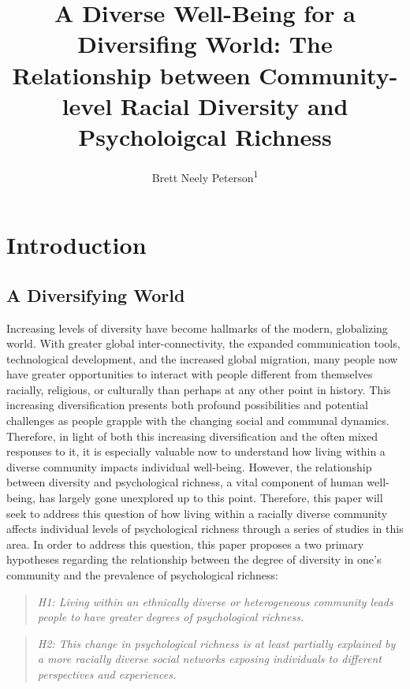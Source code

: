 \documentclass[
  man,floatsintext]{apa7}
\title{A Diverse Well-Being for a Diversifing World: The Relationship between Community-level Racial Diversity and Psycholoigcal Richness}
\author{Brett Neely Peterson\textsuperscript{1}}
\date{}
\affiliation{\vspace{0.5cm}\textsuperscript{1} The University of Chicago}
\begin{document}
\maketitle

\hypertarget{introduction}{%
\section{Introduction}\label{introduction}}

\hypertarget{a-diversifying-world}{%
\subsection{A Diversifying World}\label{a-diversifying-world}}

Increasing levels of diversity have become hallmarks of the modern, globalizing world. With greater global inter-connectivity, the expanded communication tools, technological development, and the increased global migration, many people now have greater opportunities to interact with people different from themselves racially, religious, or culturally than perhaps at any other point in history. This increasing diversification presents both profound possibilities and potential challenges as people grapple with the changing social and communal dynamics. Therefore, in light of both this increasing diversification and the often mixed responses to it, it is especially valuable now to understand how living within a diverse community impacts individual well-being. However, the relationship between diversity and psychological richness, a vital component of human well-being, has largely gone unexplored up to this point. Therefore, this paper will seek to address this question of how living within a racially diverse community affects individual levels of psychological richness through a series of studies in this area. In order to address this question, this paper proposes a two primary hypotheses regarding the relationship between the degree of diversity in one's community and the prevalence of psychological richness:

\begin{quote}
\emph{H1: Living within an ethnically diverse or heterogeneous community leads people to have greater degrees of psychological richness.}
\end{quote}

\begin{quote}
\emph{H2: This change in psychological richness is at least partially explained by a more racially diverse social networks exposing individuals to different perspectives and experiences.}
\end{quote}
\end{document}
